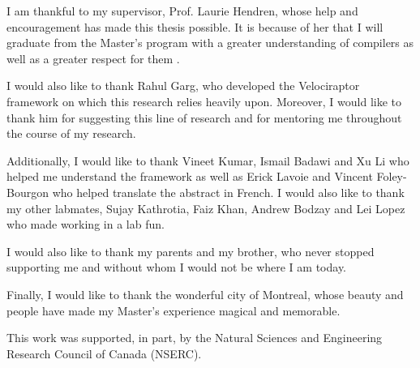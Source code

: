 I am thankful to my supervisor, Prof. Laurie Hendren, whose help and encouragement has made this thesis possible. It is because of her that I will graduate from the Master's program with a greater understanding  of compilers as well as a greater respect for them . 

I would also like to thank Rahul Garg, who developed the Velociraptor framework on which this research relies heavily upon. Moreover, I would like to thank him for suggesting this line of research and for mentoring me throughout the course of my research. 

Additionally, I would like to thank Vineet Kumar, Ismail Badawi and Xu Li who helped me understand the \mclab framework as well as Erick Lavoie and Vincent Foley-Bourgon who helped translate the abstract in French. I would also like to thank my other labmates, Sujay Kathrotia, Faiz Khan, Andrew Bodzay and Lei Lopez who made working in a lab fun. 

I would also  like to thank my parents and my brother, who never stopped supporting me and without whom I would not be where I am today. 

Finally, I would like to thank the wonderful city of Montreal, whose beauty and people have made my Master's experience magical and memorable. 

This work was supported, in part, by the Natural Sciences and Engineering Research
Council of Canada (NSERC).
